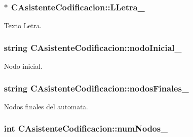 \subsubsection[{\texorpdfstring{L\+Letra\+\_\+}{LLetra_}}]{$\ast$ C\+Asistente\+Codificacion\+::\+L\+Letra\+\_\+\hspace{0.3cm}{\ttfamily [private]}}\hypertarget{classCAsistenteCodificacion_a1da0f6a2c6447b3f0f7e7e9267ef278c}{}\label{classCAsistenteCodificacion_a1da0f6a2c6447b3f0f7e7e9267ef278c}


Texto Letra. 

\subsubsection[{\texorpdfstring{nodo\+Inicial\+\_\+}{nodoInicial_}}]{\setlength{\rightskip}{0pt plus 5cm}string C\+Asistente\+Codificacion\+::nodo\+Inicial\+\_\+\hspace{0.3cm}{\ttfamily [private]}}\hypertarget{classCAsistenteCodificacion_ad0d97f8664aa927a414b7fe17b6106d4}{}\label{classCAsistenteCodificacion_ad0d97f8664aa927a414b7fe17b6106d4}


Nodo inicial. 

\subsubsection[{\texorpdfstring{nodos\+Finales\+\_\+}{nodosFinales_}}]{\setlength{\rightskip}{0pt plus 5cm}string C\+Asistente\+Codificacion\+::nodos\+Finales\+\_\+\hspace{0.3cm}{\ttfamily [private]}}\hypertarget{classCAsistenteCodificacion_afa94c6d482da4f5eb193ddd7211db25f}{}\label{classCAsistenteCodificacion_afa94c6d482da4f5eb193ddd7211db25f}


Nodos finales del automata. 

\subsubsection[{\texorpdfstring{num\+Nodos\+\_\+}{numNodos_}}]{\setlength{\rightskip}{0pt plus 5cm}int C\+Asistente\+Codificacion\+::num\+Nodos\+\_\+\hspace{0.3cm}{\ttfamily [private]}}\hypertarget{classCAsistenteCodificacion_a3c77dcdb74837345c1da4a6a7051ee4e}{}\label{classCAsistenteCodificacion_a3c77dcdb74837345c1da4a6a7051ee4e}


